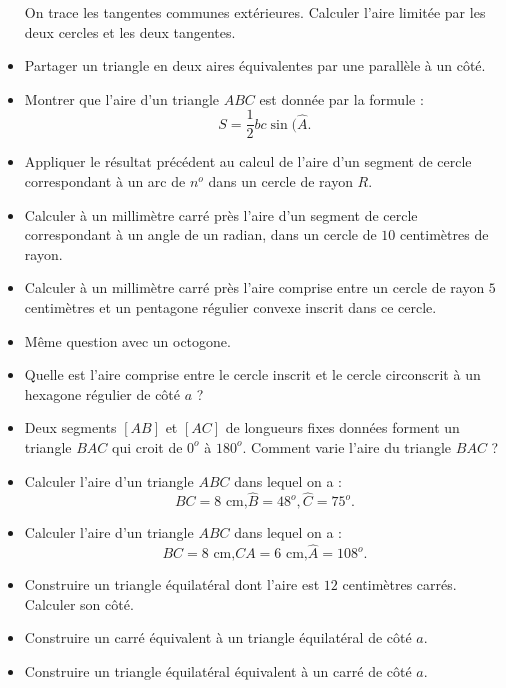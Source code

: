 \documentclass[12 pt]{report}
\theoremstyle{plain}
\newcounter{n}
\renewcommand{\it}{\item[$\mathbf{\then}.$]\stepcounter{n} }
\begin{document}
\begin{itemize}
On trace les tangentes communes extérieures. Calculer l'aire limitée par les deux cercles et les deux tangentes. 
\it Partager un triangle en deux aires équivalentes par une parallèle à un côté. 
\it Montrer que l'aire d'un triangle $ABC$ est donnée par la formule : \[ S = \frac12bc \sin(\widehat{A}.\]
\it Appliquer le résultat précédent au calcul de l'aire d'un segment de cercle correspondant à un arc de $n^o$ dans un cercle de rayon $R$.
\it Calculer à un millimètre carré près l'aire d'un segment de cercle correspondant à un angle de un radian, dans un cercle de $10$ centimètres de rayon. 
\it Calculer à un millimètre carré près l'aire comprise entre un cercle de rayon $5$ centimètres et un pentagone régulier convexe inscrit dans ce cercle. 
\it Même question avec un octogone. 
\it Quelle est l'aire comprise entre le cercle inscrit et le cercle circonscrit à un hexagone régulier de côté $a$ ? 
\it Deux segments $[AB]$ et $[AC]$ de longueurs fixes données forment un triangle $BAC$ qui croit de $0^o$ à $180^o$. Comment varie l'aire du triangle $BAC$ ?
\it Calculer l'aire d'un triangle $ABC$ dans lequel on a : \[BC = 8\text{ cm,} \widehat{B} = 48^o, \widehat{C}= 75^o.\]
\it Calculer l'aire d'un triangle $ABC$ dans lequel on a : \[BC = 8\text{ cm,} CA = 6 \text{ cm,} \widehat{A}= 108^o.\]
\it Construire un triangle équilatéral dont l'aire est $12$ centimètres carrés. Calculer son côté. 
\it Construire un carré équivalent à un triangle équilatéral de côté $a$.
\it Construire un triangle équilatéral équivalent à un carré de côté $a$. 
\end{itemize} 
\end{document}
